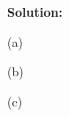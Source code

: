 \documentclass[10pt]{article}
\begin{document}
\begin{enumerate}[1.]
		\textbf{Solution:}
        
(a)




(b)



(c)




\end{enumerate}
\end{document}
